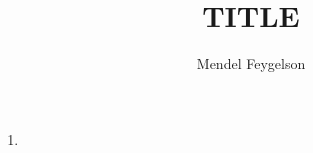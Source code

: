 \documentclass{article}
\title{TITLE}
\author{Mendel Feygelson}
\begin{document}
\maketitle
\begin{enumerate}

  \item <++>

\end{enumerate}
\end{document}
